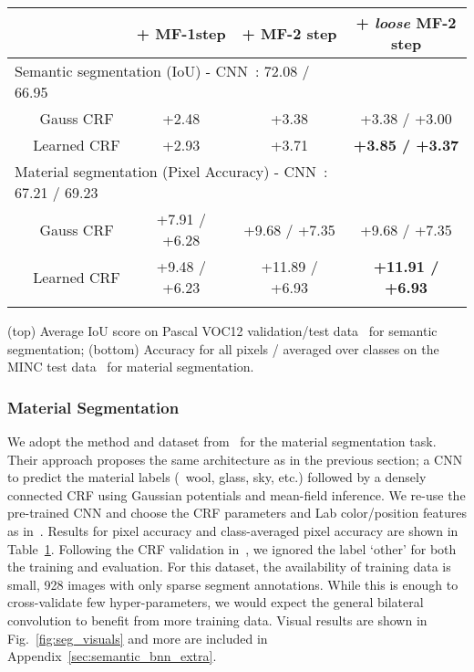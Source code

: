 \begin{table}[t]
\setlength{\tabcolsep}{2pt}
  \scriptsize
  \centering
    \begin{tabular}{l c c c c}
      \toprule
&  & + \textbf{MF-1step} & + \textbf{MF-2 step} & + \textbf{\textit{loose} MF-2 step} \\ [0.1cm]
      \midrule
      \multicolumn{4}{l}{Semantic segmentation (IoU) - CNN~\cite{chen2014semantic}: 72.08 / 66.95} & \\
      & Gauss CRF & +2.48 & +3.38  & +3.38 / +3.00   \\
      & Learned CRF & +2.93 & +3.71  &  \textbf{+3.85 / +3.37} \\
     \midrule
     \multicolumn{4}{l}{Material segmentation (Pixel Accuracy) - CNN~\cite{bell2015minc}: 67.21 / 69.23 } & \\
      & Gauss CRF & +7.91 / +6.28 & +9.68 / +7.35  &  +9.68 / +7.35  \\
      & Learned CRF & +9.48 / +6.23 & +11.89 / +6.93  &  \textbf{+11.91 / +6.93} \\
      \\
    \end{tabular}
     {(top) Average IoU score on Pascal VOC12
    validation/test data~\cite{voc2012segmentation} for semantic segmentation; (bottom) Accuracy for
    all pixels / averaged over classes on the MINC test data~\cite{bell2015minc} for material segmentation.}
  \label{tbl:seg_results}
\end{table}

\subsubsection{Material Segmentation}

We adopt the method and dataset from~\cite{bell2015minc} for the material segmentation task.
Their approach
proposes the same architecture as in the previous section; a CNN to predict the material labels (\eg\ wool, glass, sky, etc.)
followed by a densely connected CRF using Gaussian potentials and mean-field inference.
We re-use the pre-trained CNN and choose the
CRF parameters and Lab color/position features as in~\cite{bell2015minc}.
Results for pixel accuracy and class-averaged pixel accuracy are shown in Table~\ref{tbl:seg_results}.
Following the CRF validation in~\cite{bell2015minc}, we ignored the label `other' for both the training and
evaluation. For this dataset, the availability of training data is small, 928 images with
only sparse segment annotations. While this is enough to cross-validate few hyper-parameters, we would
expect the general bilateral convolution to benefit from
more training data.
Visual results are shown in Fig.~\ref{fig:seg_visuals} and more are included in
Appendix~\ref{sec:semantic_bnn_extra}.

